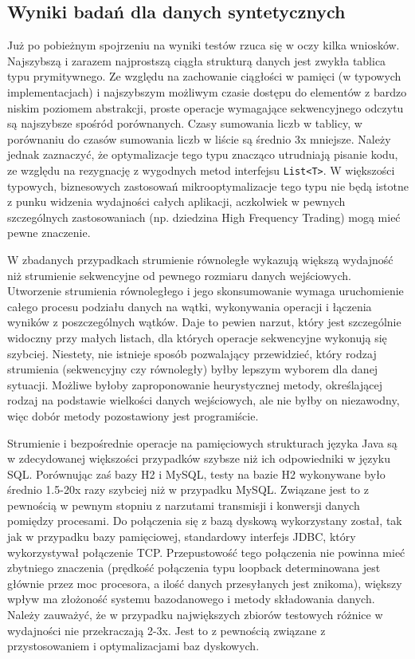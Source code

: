 \documentclass[12pt]{extarticle}
\begin{document}
\subsection{Wyniki badań dla danych syntetycznych}

    Już po pobieżnym spojrzeniu na wyniki testów rzuca się w oczy kilka wniosków. Najszybszą i zarazem najprostszą ciągła strukturą danych jest zwykła tablica typu prymitywnego. Ze względu na zachowanie ciągłości w pamięci (w typowych implementacjach) i najszybszym możliwym czasie dostępu do elementów z bardzo niskim poziomem abstrakcji, proste operacje wymagające sekwencyjnego odczytu są najszybsze spośród porównanych. Czasy sumowania liczb w tablicy, w porównaniu do czasów sumowania liczb w liście są średnio 3x mniejsze. Należy jednak zaznaczyć, że optymalizacje tego typu znacząco utrudniają pisanie kodu, ze względu na rezygnację z wygodnych metod interfejsu \texttt{List<T>}. W większości typowych, biznesowych zastosowań mikrooptymalizacje tego typu nie będą istotne z punku widzenia wydajności całych aplikacji, aczkolwiek w pewnych szczególnych zastosowaniach (np. dziedzina High Frequency Trading) mogą mieć pewne znaczenie.

    W zbadanych przypadkach strumienie równoległe wykazują większą wydajność niż strumienie sekwencyjne od pewnego rozmiaru danych wejściowych. Utworzenie strumienia równoległego i jego skonsumowanie wymaga uruchomienie całego procesu podziału danych na wątki, wykonywania operacji i łączenia wyników z poszczególnych wątków. Daje to pewien narzut, który jest szczególnie widoczny przy małych listach, dla których operacje sekwencyjne wykonują się szybciej. Niestety, nie istnieje sposób pozwalający przewidzieć, który rodzaj strumienia (sekwencyjny czy równoległy) byłby lepszym wyborem dla danej sytuacji. Możliwe byłoby zaproponowanie heurystycznej metody, określającej rodzaj na podstawie wielkości danych wejściowych, ale nie byłby on niezawodny, więc dobór metody pozostawiony jest programiście.

    Strumienie i bezpośrednie operacje na pamięciowych strukturach języka Java są w zdecydowanej większości przypadków szybsze niż ich odpowiedniki w języku SQL. Porównując zaś bazy H2 i MySQL, testy na bazie H2 wykonywane było średnio 1.5-20x razy szybciej niż w przypadku MySQL. Związane jest to z pewnością w pewnym stopniu z narzutami transmisji i konwersji danych pomiędzy procesami. Do połączenia się z bazą dyskową wykorzystany został, tak jak w przypadku bazy pamięciowej, standardowy interfejs JDBC, który wykorzystywał połączenie TCP. Przepustowość tego połączenia nie powinna mieć zbytniego znaczenia (prędkość połączenia typu loopback determinowana jest głównie przez moc procesora, a ilość danych przesyłanych jest znikoma), większy wpływ ma złożoność systemu bazodanowego i metody składowania danych. Należy zauważyć, że w przypadku największych zbiorów testowych różnice w wydajności nie przekraczają 2-3x. Jest to z pewnością związane z przystosowaniem i optymalizacjami baz dyskowych.
\end{document}
